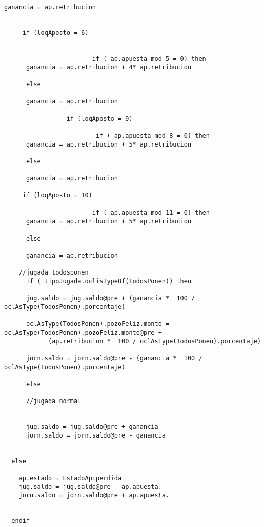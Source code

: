 \begin{framed}
\begin{lstlisting}[breaklines=true]
      ganancia = ap.retribucion 
      

     if (loqAposto = 6)


                        if ( ap.apuesta mod 5 = 0) then
      ganancia = ap.retribucion + 4* ap.retribucion
      
      else
      
      ganancia = ap.retribucion 
      
                 if (loqAposto = 9)

                         if ( ap.apuesta mod 8 = 0) then
      ganancia = ap.retribucion + 5* ap.retribucion
      
      else
      
      ganancia = ap.retribucion 
      
     if (loqAposto = 10)

                        if ( ap.apuesta mod 11 = 0) then
      ganancia = ap.retribucion + 5* ap.retribucion
      
      else
      
      ganancia = ap.retribucion 
      
    //jugada todosponen
      if ( tipoJugada.oclisTypeOf(TodosPonen)) then 
    
      jug.saldo = jug.saldo@pre + (ganancia *  100 / oclAsType(TodosPonen).porcentaje)
    
      oclAsType(TodosPonen).pozoFeliz.monto = oclAsType(TodosPonen).pozoFeliz.monto@pre + 
            (ap.retribucion *  100 / oclAsType(TodosPonen).porcentaje)

      jorn.saldo = jorn.saldo@pre - (ganancia *  100 / oclAsType(TodosPonen).porcentaje)

      else

      //jugada normal


      jug.saldo = jug.saldo@pre + ganancia
      jorn.saldo = jorn.saldo@pre - ganancia  
  

  else

    ap.estado = EstadoAp:perdida
    jug.saldo = jug.saldo@pre - ap.apuesta.
    jorn.saldo = jorn.saldo@pre + ap.apuesta.


  endif
\end{lstlisting}  

\end{framed}
